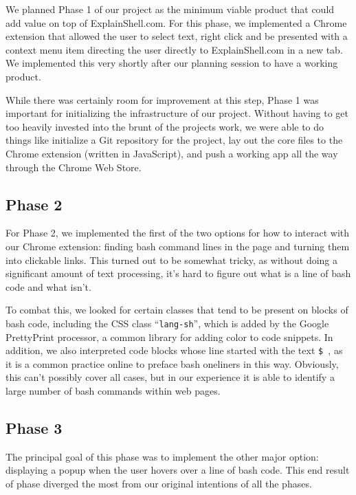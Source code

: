 \documentclass[11pt]{article}
\begin{document}
We planned Phase 1 of our project as the minimum viable product that could add
value on top of ExplainShell.com. For this phase, we implemented a Chrome
extension that allowed the user to select text, right click and be presented
with a context menu item directing the user directly to ExplainShell.com in a
new tab. We implemented this very shortly after our planning session to have a
working product.

While there was certainly room for improvement at this step, Phase 1 was
important for initializing the infrastructure of our project. Without having to
get too heavily invested into the brunt of the projects work, we were able to do
things like initialize a Git repository for the project, lay out the core files
to the Chrome extension (written in JavaScript), and push a working app all the
way through the Chrome Web Store.

\subsection{Phase 2}

For Phase 2, we implemented the first of the two options for how to interact
with our Chrome extension: finding bash command lines in the page and turning
them into clickable links. This turned out to be somewhat tricky, as without
doing a significant amount of text processing, it's hard to figure out what is a
line of bash code and what isn't.

To combat this, we looked for certain classes that tend to be present on blocks
of bash code, including the CSS class ``\texttt{lang-sh}'', which is added by the Google
PrettyPrint processor, a common library for adding color to code snippets. In
addition, we also interpreted code blocks whose line started with the text
\texttt{\$ }, as it is a common practice online to preface bash oneliners in
this way. Obviously, this can't possibly cover all cases, but in our experience
it is able to identify a large number of bash commands within web pages.

\subsection{Phase 3}

The principal goal of this phase was to implement the other major option:
displaying a popup when the user hovers over a line of bash code. This end
result of phase diverged the most from our original intentions of all the
phases.
\end{document}
